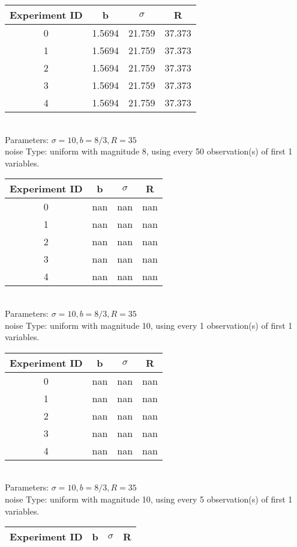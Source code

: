 \begin{multicols}{3}
\begin{tabular}{cccc}
\hline Experiment ID & b & $\sigma$ & R \\ \hline 
0 & 1.5694 & 21.759 & 37.373\\ \hline 
 1 & 1.5694 & 21.759 & 37.373\\ \hline 
 2 & 1.5694 & 21.759 & 37.373\\ \hline 
 3 & 1.5694 & 21.759 & 37.373\\ \hline 
 4 & 1.5694 & 21.759 & 37.373\\ \hline 
 \end{tabular}\\
Parameters: $\sigma=10, b=8/3, R=35$\\
noise Type: uniform with magnitude 8, using every 50 observation(s) of first 1 variables.\\
\begin{tabular}{cccc}
\hline Experiment ID & b & $\sigma$ & R \\ \hline 
0 & nan & nan & nan\\ \hline 
 1 & nan & nan & nan\\ \hline 
 2 & nan & nan & nan\\ \hline 
 3 & nan & nan & nan\\ \hline 
 4 & nan & nan & nan\\ \hline 
 \end{tabular}\\
Parameters: $\sigma=10, b=8/3, R=35$\\
noise Type: uniform with magnitude 10, using every 1 observation(s) of first 1 variables.\\
\begin{tabular}{cccc}
\hline Experiment ID & b & $\sigma$ & R \\ \hline 
0 & nan & nan & nan\\ \hline 
 1 & nan & nan & nan\\ \hline 
 2 & nan & nan & nan\\ \hline 
 3 & nan & nan & nan\\ \hline 
 4 & nan & nan & nan\\ \hline 
 \end{tabular}\\
Parameters: $\sigma=10, b=8/3, R=35$\\
noise Type: uniform with magnitude 10, using every 5 observation(s) of first 1 variables.\\
\begin{tabular}{cccc}
\hline Experiment ID & b & $\sigma$ & R \\ \hline 

\end{tabular}
\end{multicols}
